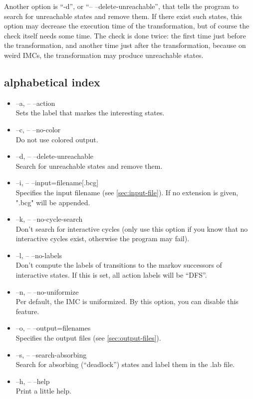 \documentclass[a4paper,11pt]{scrartcl}
\newcommand{\dd}{-- --}
\begin{document}
Another option is ``-d'', or ``\dd delete-unreachable'', that tells the program to
search for unreachable states and remove them. If there exist such states,
this option may decrease the execution time of the transformation, but of
course the check itself needs some time. The check is done twice: the first time
just before the transformation, and another time just after the transformation,
because on weird IMCs, the transformation may produce unreachable states.

\subsection{alphabetical index}

\begin{itemize}

\item --a, \quad \dd action\\
      Sets the label that markes the interesting states.

\item --c, \quad \dd no-color\\
      Do not use colored output.

\item --d, \quad \dd delete-unreachable\\
      Search for unreachable states and remove them.

\item --i, \quad \dd input=filename[.bcg]\\
      Specifies the input filename (see \ref{sec:input-file}). If no extension is given, ".bcg"
      will be appended.

\item --k, \quad \dd no-cycle-search\\
      Don't search for interactive cycles (only use this option if you know
      that no interactive cycles exist, otherwise the program may fail).

\item --l, \quad \dd no-labels\\
      Don't compute the labels of transitions to the markov successors of interactive states.
      If this is set, all action labels will be ``DFS''.

\item --n, \quad \dd no-uniformize\\
      Per default, the IMC is uniformized. By this option, you can
      disable this feature.

\item --o, \quad \dd output=filenames\\
      Specifies the output files (see \ref{sec:output-files}).

\item --s, \quad \dd search-absorbing\\
      Search for absorbing (``deadlock'') states and label them in the .lab
      file.

\item --h, \quad \dd help\\
      Print a little help.

\end{itemize}
\end{document}
